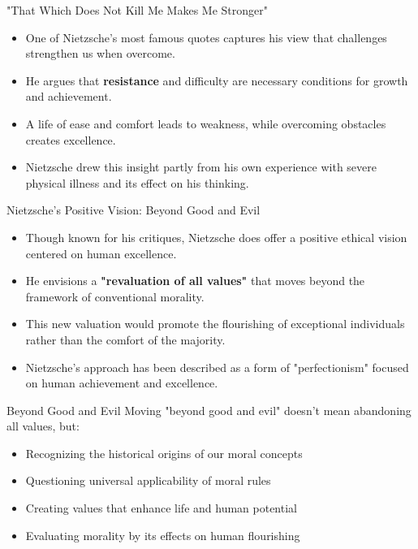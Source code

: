 \documentclass{beamer}
\begin{document}
\begin{frame}{"That Which Does Not Kill Me Makes Me Stronger"}
\begin{itemize}
\small
\item One of Nietzsche's most famous quotes captures his view that challenges strengthen us when overcome.
\item He argues that \textbf{resistance} and difficulty are necessary conditions for growth and achievement.
\item A life of ease and comfort leads to weakness, while overcoming obstacles creates excellence.
\item Nietzsche drew this insight partly from his own experience with severe physical illness and its effect on his thinking.
\end{itemize}
\end{frame}

\begin{frame}{Nietzsche's Positive Vision: Beyond Good and Evil}
\begin{itemize}
\item Though known for his critiques, Nietzsche does offer a positive ethical vision centered on human excellence.
\item He envisions a \textbf{"revaluation of all values"} that moves beyond the framework of conventional morality.
\item This new valuation would promote the flourishing of exceptional individuals rather than the comfort of the majority.
\item Nietzsche's approach has been described as a form of "perfectionism" focused on human achievement and excellence.
\end{itemize}

\begin{block}{Beyond Good and Evil}
Moving "beyond good and evil" doesn't mean abandoning all values, but:
\begin{itemize}
\item Recognizing the historical origins of our moral concepts
\item Questioning universal applicability of moral rules
\item Creating values that enhance life and human potential
\item Evaluating morality by its effects on human flourishing
\end{itemize}
\end{block}
\end{frame}
\end{document}
